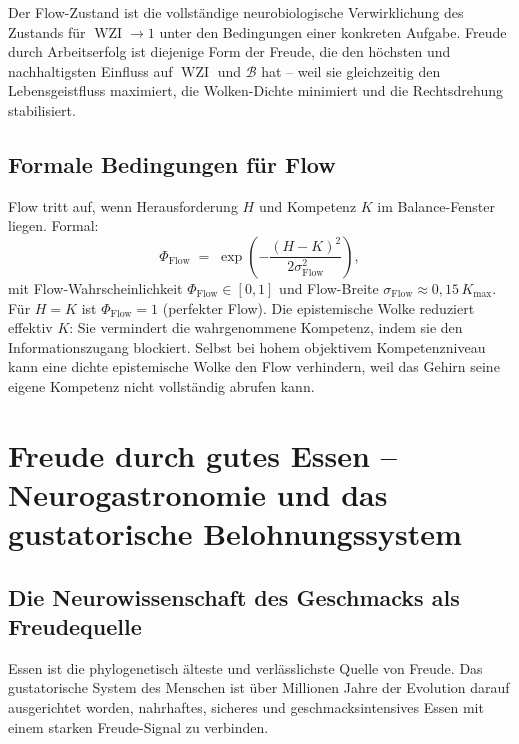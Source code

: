 ﻿\documentclass[12pt,a4paper]{report}
\theoremstyle{plain}
\theoremstyle{definition}
\theoremstyle{remark}
\DeclareMathOperator{\WZI}{WZI}
\begin{document}
		Der Flow-Zustand ist die vollständige neurobiologische Verwirklichung
		des Zustands für $\WZI \to 1$ unter den Bedingungen einer konkreten
		Aufgabe. Freude durch Arbeitserfolg ist diejenige Form der Freude,
		die den höchsten und nachhaltigsten Einfluss auf $\WZI$ und $\mathcal{B}$
		hat -- weil sie gleichzeitig den Lebensgeistfluss maximiert,
		die Wolken-Dichte minimiert und die Rechtsdrehung stabilisiert.


	\subsection{Formale Bedingungen für Flow}

	Flow tritt auf, wenn Herausforderung $H$ und Kompetenz $K$
	im Balance-Fenster liegen. Formal:
	\[
	\Phi_{\mathrm{Flow}} \;=\;
	\exp\!\left(-\frac{(H - K)^2}{2\sigma_{\mathrm{Flow}}^2}\right),
	\]
	mit Flow-Wahrscheinlichkeit $\Phi_{\mathrm{Flow}} \in [0,1]$
	und Flow-Breite $\sigma_{\mathrm{Flow}} \approx 0{,}15\,K_{\max}$.
	Für $H = K$ ist $\Phi_{\mathrm{Flow}} = 1$ (perfekter Flow).
	Die epistemische Wolke reduziert effektiv $K$: Sie vermindert die
	wahrgenommene Kompetenz, indem sie den Informationszugang blockiert.
	Selbst bei hohem objektivem Kompetenzniveau kann eine dichte
	epistemische Wolke den Flow verhindern, weil das Gehirn seine
	eigene Kompetenz nicht vollständig abrufen kann.

	\section{Freude durch gutes Essen -- Neurogastronomie und das gustatorische Belohnungssystem}

	\subsection{Die Neurowissenschaft des Geschmacks als Freudequelle}

	Essen ist die phylogenetisch älteste und verlässlichste Quelle
	von Freude. Das gustatorische System des Menschen ist über
	Millionen Jahre der Evolution darauf ausgerichtet worden,
	nahrhaftes, sicheres und geschmacksintensives Essen mit einem
	starken Freude-Signal zu verbinden.
\end{document}
